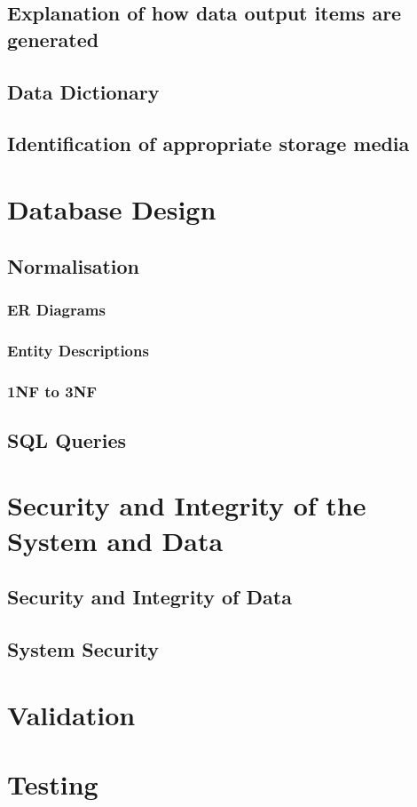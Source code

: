 \subsection{Explanation of how data output items are generated}

\subsection{Data Dictionary}

\subsection{Identification of appropriate storage media}

\section{Database Design}

\subsection{Normalisation}

\subsubsection{ER Diagrams}

\subsubsection{Entity Descriptions}

\subsubsection{1NF to 3NF}

\subsection{SQL Queries}

\section{Security and Integrity of the System and Data}

\subsection{Security and Integrity of Data}

\subsection{System Security}

\section{Validation}

\section{Testing}

